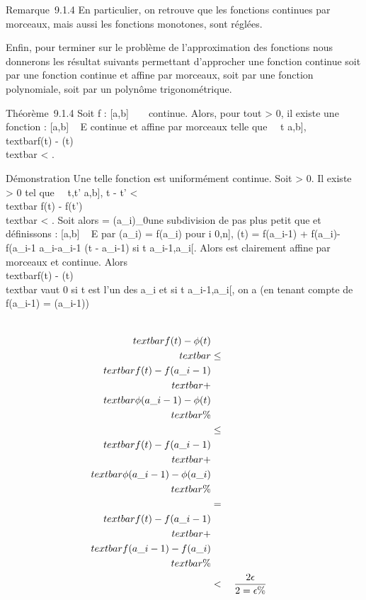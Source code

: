 \documentclass[]{article}
\begin{document}
Remarque~9.1.4 En particulier, on retrouve que les fonctions continues
par morceaux, mais aussi les fonctions monotones, sont réglées.

Enfin, pour terminer sur le problème de l'approximation des fonctions
nous donnerons les résultat suivants permettant d'approcher une fonction
continue soit par une fonction continue et affine par morceaux, soit par
une fonction polynomiale, soit par un polynôme trigonométrique.

Théorème~9.1.4 Soit f : {[}a,b{]} \rightarrow~ ~ continue. Alors, pour tout \epsilon
\textgreater{} 0, il existe une fonction \phi : {[}a,b{]} \rightarrow~ E continue et
affine par morceaux telle que \forall~~t \in {[}a,b{]},
\\textbar{}f(t) - \phi(t)\\textbar{}
\textless{} \epsilon.

Démonstration Une telle fonction est uniformément continue. Soit \epsilon
\textgreater{} 0. Il existe \eta \textgreater{} 0 tel que
\forall~~t,t' \in {[}a,b{]}, \textbar{}t - t'\textbar{}
\textless{} \eta \rigtharrow~\\textbar{} f(t) -
f(t')\\textbar{} \textless{} \epsilon {}
. Soit alors \sigma = (a\_i)\_0\leqi\leqn une subdivision de pas
plus petit que \eta et définissons \phi : {[}a,b{]} \rightarrow~ E par \phi(a\_i) =
f(a\_i) pour i \in {[}0,n{]}, \phi(t) = f(a\_i-1) +
f(a\_i)-f(a\_i-1 \over
a\_i-a\_i-1 (t - a\_i-1) si t
\in{]}a\_i-1,a\_i{[}. Alors \phi est clairement affine par
morceaux et continue. Alors \\textbar{}f(t) -
\phi(t)\\textbar{} vaut 0 si t est l'un des a\_i et
si t \in{]}a\_i-1,a\_i{[}, on a (en tenant compte de
f(a\_i-1) = \phi(a\_i-1))

\begin{align*} \\textbar{}f(t) -
\phi(t)\\textbar{}& \leq& \\textbar{}f(t) -
f(a\_i-1)\\textbar{} +\\textbar{}
\phi(a\_i-1) - \phi(t)\\textbar{} \%&
\\ & \leq& \\textbar{}f(t) -
f(a\_i-1)\\textbar{} +\\textbar{}
\phi(a\_i-1) - \phi(a\_i)\\textbar{}\%&
\\ & =& \\textbar{}f(t) -
f(a\_i-1)\\textbar{} +\\textbar{}
f(a\_i-1) - f(a\_i)\\textbar{}\%&
\\ & \textless{}& 2 \epsilon
\over 2 = \epsilon \%& \\
\end{align*}
\end{document}
